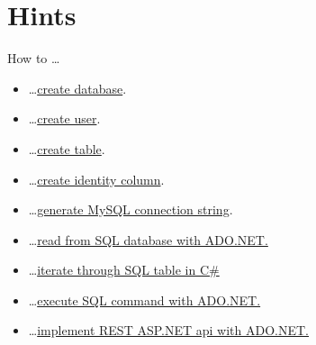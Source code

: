 \documentclass[12pt]{article}
\begin{document}
\clearpage

\section*{Hints}
How to \dots
\begin{itemize}
\item \dots \href{https://dev.mysql.com/doc/refman/5.7/en/creating-database.html}{create database}.
\item \dots \href{https://www.digitalocean.com/community/tutorials/mysql-ru}{create user}.
\item \dots \href{https://dev.mysql.com/doc/refman/5.5/en/creating-tables.html}{create table}.
\item \dots \href{https://dev.mysql.com/doc/refman/5.7/en/example-auto-increment.html}{create identity column}.
\item \dots \href{https://www.connectionstrings.com/mysql/}{generate MySQL connection string}.
\item \dots \href{https://stackoverflow.com/questions/6073382/read-sql-table-into-c-sharp-datatable}{read from SQL database with ADO.NET.}
\item \dots \href{https://stackoverflow.com/questions/1774498/how-to-iterate-through-a-datatable}{iterate through SQL table in C\#}
\item \dots \href{https://docs.microsoft.com/en-us/dotnet/framework/data/adonet/executing-a-command}{execute SQL command with ADO.NET.}
\item \dots \href{http://www.c-sharpcorner.com/UploadFile/97fc7a/webapi-restful-operations-in-webapi-using-ado-net-objects-a/}{implement REST ASP.NET api with ADO.NET.}

\end{itemize}
\end{document}
